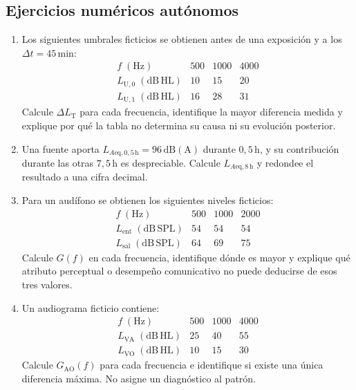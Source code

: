 \subsection*{Ejercicios numéricos autónomos}

\begin{enumerate}[label=\textbf{NA\arabic*.},leftmargin=*]
    \item Los siguientes umbrales ficticios se obtienen antes de una
    exposición y a los \(\Delta t=45\,\mathrm{min}\):
    \[
    \begin{array}{c|ccc}
        f\;(\mathrm{Hz}) & 500 & 1000 & 4000 \\ \hline
        L_{\mathrm{U},0}\;(\mathrm{dB\,HL}) & 10 & 15 & 20 \\
        L_{\mathrm{U},1}\;(\mathrm{dB\,HL}) & 16 & 28 & 31
    \end{array}
    \]
    Calcule \(\Delta L_{\mathrm{T}}\) para cada frecuencia, identifique la
    mayor diferencia medida y explique por qué la tabla no determina su causa
    ni su evolución posterior.

    \item Una fuente aporta \(L_{A\mathrm{eq},0{,}5\,\mathrm{h}}=96\,\mathrm{dB(A)}\)
    durante \(0{,}5\,\mathrm{h}\), y su contribución durante las otras
    \(7{,}5\,\mathrm{h}\) es despreciable. Calcule
    \(L_{A\mathrm{eq},8\,\mathrm{h}}\) y redondee el resultado a una cifra decimal.

    \item Para un audífono se obtienen los siguientes niveles ficticios:
    \[
    \begin{array}{c|ccc}
        f\;(\mathrm{Hz}) & 500 & 1000 & 2000 \\ \hline
        L_{\mathrm{ent}}\;(\mathrm{dB\,SPL}) & 54 & 54 & 54 \\
        L_{\mathrm{sal}}\;(\mathrm{dB\,SPL}) & 64 & 69 & 75
    \end{array}
    \]
    Calcule \(G(f)\) en cada frecuencia, identifique dónde es mayor y explique
    qué atributo perceptual o desempeño comunicativo no puede deducirse de
    esos tres valores.

    \item Un audiograma ficticio contiene:
    \[
    \begin{array}{c|ccc}
        f\;(\mathrm{Hz}) & 500 & 1000 & 4000 \\ \hline
        L_{\mathrm{VA}}\;(\mathrm{dB\,HL}) & 25 & 40 & 55 \\
        L_{\mathrm{VO}}\;(\mathrm{dB\,HL}) & 10 & 15 & 30
    \end{array}
    \]
    Calcule \(G_{\mathrm{AO}}(f)\) para cada frecuencia e identifique si existe
    una única diferencia máxima. No asigne un diagnóstico al patrón.
\end{enumerate}

